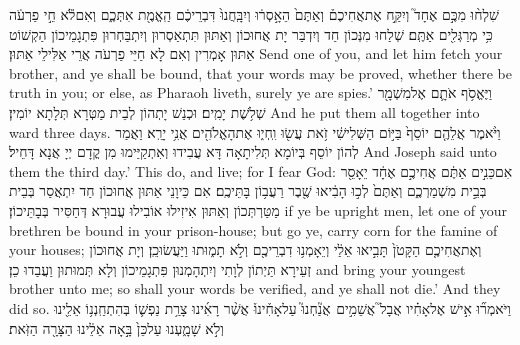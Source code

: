 {שִׁלְח֨וּ מִכֶּ֣ם אֶחָד֮ וְיִקַּ֣ח אֶת\maqqaf אֲחִיכֶם֒ וְאַתֶּם֙ הֵאָ֣סְר֔וּ וְיִבָּֽחֲנוּ֙ דִּבְרֵיכֶ֔ם הַֽאֱמֶ֖ת אִתְּכֶ֑ם וְאִם\maqqaf לֹ֕א חֵ֣י פַרְעֹ֔ה כִּ֥י מְרַגְּלִ֖ים אַתֶּֽם׃}
{שְׁלַחוּ מִנְּכוֹן חַד וְיִדְבַּר יָת אֲחוּכוֹן וְאַתּוּן תִּתְאַסְרוּן וְיִתְבַּחְרוּן פִּתְגָמֵיכוֹן הַקְשׁוֹט אַתּוּן אָמְרִין וְאִם לָא חַיֵּי פַרְעֹה אֲרֵי אַלִּילֵי אַתּוּן׃}
{Send one of you, and let him fetch your brother, and ye shall be bound, that your words may be proved, whether there be truth in you; or else, as Pharaoh liveth, surely ye are spies.’}{}
{וַיֶּאֱסֹ֥ף אֹתָ֛ם אֶל\maqqaf מִשְׁמָ֖ר שְׁלֹ֥שֶׁת יָמִֽים׃}
{וּכְנַשׁ יָתְהוֹן לְבֵית מַטְּרָא תְּלָתָא יוֹמִין׃}
{And he put them all together into ward three days.}{}
\newseder
{}%
{וַיֹּ֨אמֶר אֲלֵהֶ֤ם יוֹסֵף֙ בַּיּ֣וֹם הַשְּׁלִישִׁ֔י זֹ֥את עֲשׂ֖וּ וִֽחְי֑וּ אֶת\maqqaf הָאֱלֹהִ֖ים אֲנִ֥י יָרֵֽא׃}
{וַאֲמַר לְהוֹן יוֹסֵף בְּיוֹמָא תְּלִיתָאָה דָּא עֲבִידוּ וְאִתְקַיַּימוּ מִן קֳדָם יְיָ אֲנָא דָּחֵיל׃}
{And Joseph said unto them the third day.’ This do, and live; for I fear God:}{}
{אִם\maqqaf כֵּנִ֣ים אַתֶּ֔ם אֲחִיכֶ֣ם אֶחָ֔ד יֵאָסֵ֖ר בְּבֵ֣ית מִשְׁמַרְכֶ֑ם וְאַתֶּם֙ לְכ֣וּ הָבִ֔יאוּ שֶׁ֖בֶר רַעֲב֥וֹן בָּתֵּיכֶֽם׃}
{אִם כֵּיוָנֵי אַתּוּן אֲחוּכוֹן חַד יִתְאֲסַר בְּבֵית מַטַּרְתְּכוֹן וְאַתּוּן אִיזִילוּ אוֹבִילוּ עֲבוּרָא דְּחַסִּיר בְּבָתֵּיכוֹן׃}
{if ye be upright men, let one of your brethren be bound in your prison-house; but go ye, carry corn for the famine of your houses;}{}
{וְאֶת\maqqaf אֲחִיכֶ֤ם הַקָּטֹן֙ תָּבִ֣יאוּ אֵלַ֔י וְיֵאָמְנ֥וּ דִבְרֵיכֶ֖ם וְלֹ֣א תָמ֑וּתוּ וַיַּעֲשׂוּ\maqqaf כֵֽן׃}
{וְיָת אֲחוּכוֹן זְעֵירָא תַּיְתוֹן לְוָתִי וְיִתְהָמְנוּן פִּתְגָמֵיכוֹן וְלָא תְּמוּתוּן וַעֲבַדוּ כֵן׃}
{and bring your youngest brother unto me; so shall your words be verified, and ye shall not die.’ And they did so.}{}
{וַיֹּאמְר֞וּ אִ֣ישׁ אֶל\maqqaf אָחִ֗יו אֲבָל֮ אֲשֵׁמִ֣ים \pasek  אֲנַ֘חְנוּ֮ עַל\maqqaf אָחִ֒ינוּ֒ אֲשֶׁ֨ר רָאִ֜ינוּ צָרַ֥ת נַפְשׁ֛וֹ בְּהִתְחַֽנְנ֥וֹ אֵלֵ֖ינוּ וְלֹ֣א שָׁמָ֑עְנוּ עַל\maqqaf כֵּן֙ בָּ֣אָה אֵלֵ֔ינוּ הַצָּרָ֖ה הַזֹּֽאת׃}
